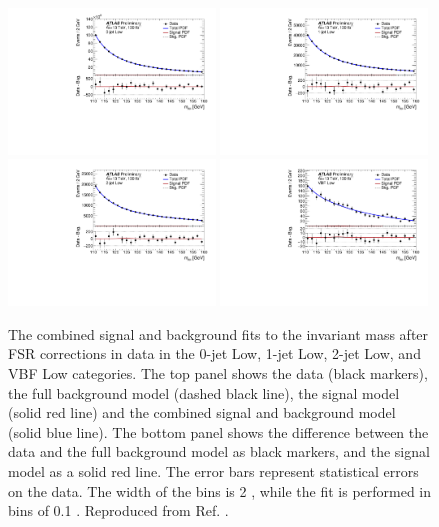 \begin{figure}[h!]
  \centering
  \includegraphics[width=0.49\textwidth]{figures/hmumu/fits/BDT12}
  \includegraphics[width=0.49\textwidth]{figures/hmumu/fits/BDT9}
  \includegraphics[width=0.49\textwidth]{figures/hmumu/fits/BDT6}
  \includegraphics[width=0.49\textwidth]{figures/hmumu/fits/BDT3}
  \caption[Combined signal and background fit to data for Low categories]{
  The combined signal and background fits to the invariant mass after FSR
  corrections in data in the 0-jet Low, 1-jet Low, 2-jet Low,
  and VBF Low categories. The top panel shows the data (black
  markers), the full background model (dashed black line), the signal
  model (solid red line) and the combined signal and background model
  (solid blue line). The bottom panel shows the difference between the data
  and the full background model as black markers, and the signal model
  as a solid red line. The error bars represent statistical errors on
  the data. The width of the bins is 2 \GeV, while the fit is
  performed in bins of 0.1 \GeV.
  Reproduced from Ref. \cite{ATLAS-CONF-2019-028}.
  }
  \label{fig:hmumu:fit-low}
\end{figure}


